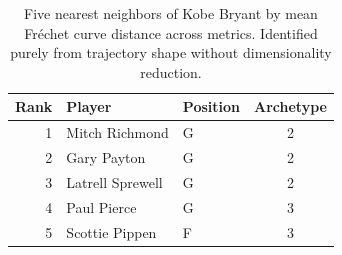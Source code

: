 \begin{table}[htbp]
  \centering\small
  \begin{tabular}{rllc}
    \toprule
    Rank & Player & Position & Archetype \\
    \midrule
    1 & Mitch Richmond & G & 2 \\
    2 & Gary Payton & G & 2 \\
    3 & Latrell Sprewell & G & 2 \\
    4 & Paul Pierce & G & 3 \\
    5 & Scottie Pippen & F & 3 \\
    \bottomrule
  \end{tabular}
  \caption{Five nearest neighbors of Kobe Bryant by mean Fr\'{e}chet curve distance across metrics. Identified purely from trajectory shape without dimensionality reduction.}
  \label{tab:Kobe_Bryant_frechet_curve_neighbors}
\end{table}

